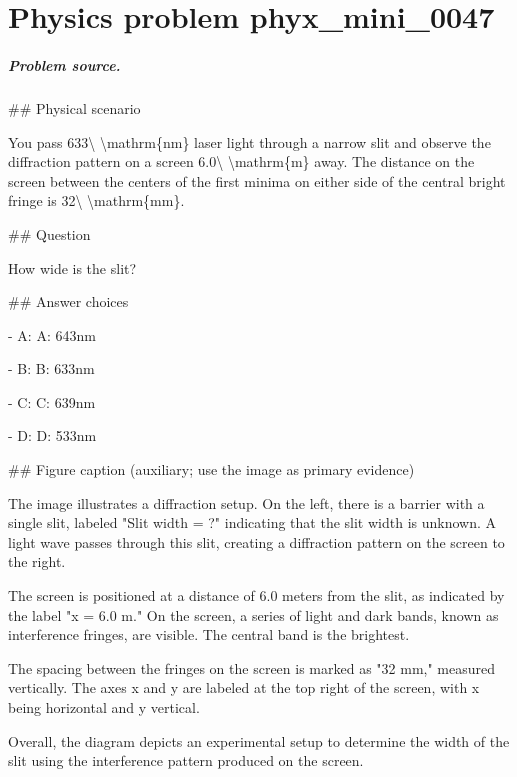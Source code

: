 
\chapter{Physics problem phyx\_mini\_0047}
\label{ch:PhyXMiniProblems_problem_phyx_mini_0047}

\paragraph{Problem source.}
\#\# Physical scenario

You pass 633\textbackslash{} \textbackslash{}mathrm\{nm\} laser light through a narrow slit and observe the diffraction pattern on a screen 6.0\textbackslash{} \textbackslash{}mathrm\{m\} away. The distance on the screen between the centers of the first minima on either side of the central bright fringe is 32\textbackslash{} \textbackslash{}mathrm\{mm\}.

\#\# Question

How wide is the slit?

\#\# Answer choices

- A: A: 643nm

- B: B: 633nm

- C: C: 639nm

- D: D: 533nm

\#\# Figure caption (auxiliary; use the image as primary evidence)

The image illustrates a diffraction setup. On the left, there is a barrier with a single slit, labeled "Slit width = ?" indicating that the slit width is unknown. A light wave passes through this slit, creating a diffraction pattern on the screen to the right.

The screen is positioned at a distance of 6.0 meters from the slit, as indicated by the label "x = 6.0 m." On the screen, a series of light and dark bands, known as interference fringes, are visible. The central band is the brightest.

The spacing between the fringes on the screen is marked as "32 mm," measured vertically. The axes x and y are labeled at the top right of the screen, with x being horizontal and y vertical.

Overall, the diagram depicts an experimental setup to determine the width of the slit using the interference pattern produced on the screen.

